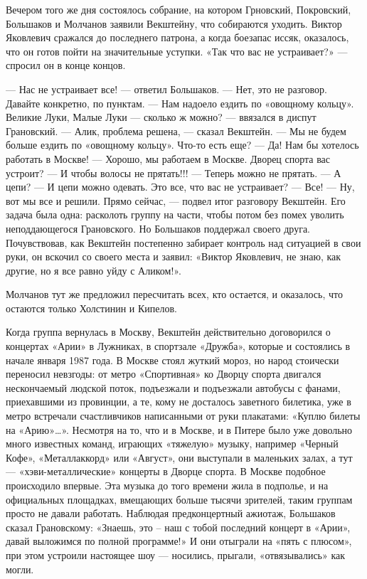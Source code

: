\documentclass[16pt,a5paper,oneside]{book}
\begin{document}
Вечером того же дня состоялось собрание, на котором Грновский, Покровский, Большаков и Молчанов заявили Векштейну, что
собираются уходить. Виктор Яковлевич сражался до последнего патрона, а когда боезапас иссяк, оказалось, что он готов
пойти на значительные уступки. «Так что вас не устраивает?» — спросил он в конце концов.

— Нас не устраивает все! — ответил Большаков.
— Нет, это не разговор. Давайте конкретно, по пунктам.
— Нам надоело ездить по «овощному кольцу». Великие Луки, Малые Луки — сколько ж можно? — ввязался в диспут Грановский.
— Алик, проблема решена, — сказал Векштейн. — Мы не будем больше ездить по «овощному кольцу». Что-то есть еще?
— Да! Нам бы хотелось работать в Москве!
— Хорошо, мы работаем в Москве. Дворец спорта вас устроит?
— И чтобы волосы не прятать!!!
— Теперь можно не прятать.
— А цепи?
— И цепи можно одевать. Это все, что вас не устраивает?
— Все!
— Ну, вот мы все и решили. Прямо сейчас, — подвел итог разговору Векштейн. Его задача была одна: расколоть группу на
части, чтобы потом без помех уволить неподдающегося Грановского. Но Большаков поддержал своего друга. Почувствовав, как
Векштейн постепенно забирает контроль над ситуацией в свои руки, он вскочил со своего места и заявил: «Виктор Яковлевич,
не знаю, как другие, но я все равно уйду с Аликом!».

Молчанов тут же предложил пересчитать всех, кто остается, и оказалось, что остаются только Холстинин и Кипелов.

Когда группа вернулась в Москву, Векштейн действительно договорился о концертах «Арии» в Лужниках, в спортзале «Дружба»,
которые и состоялись в начале января 1987 года. В Москве стоял жуткий мороз, но народ стоически переносил невзгоды: от
метро «Спортивная» ко Дворцу спорта двигался нескончаемый людской поток, подъезжали и подъезжали автобусы с фанами,
приехавшими из провинции, а те, кому не досталось заветного билетика, уже в метро встречали счастливчиков написанными от
руки плакатами: «Куплю билеты на «Арию»\ldots». Несмотря на то, что и в Москве, и в Питере было уже довольно много
известных команд, играющих «тяжелую» музыку, например «Черный Кофе», «Металлаккорд» или «Август», они выступали в
маленьких залах, а тут — «хэви-металлические» концерты в Дворце спорта. В Москве подобное происходило впервые. Эта
музыка до того времени жила в подполье, и на официальных площадках, вмещающих больше тысячи зрителей, таким группам
просто не давали работать. Наблюдая предконцертный ажиотаж, Большаков сказал Грановскому: «Знаешь, это – наш с тобой
последний концерт в «Арии», давай выложимся по полной программе!» И они отыграли на «пять с плюсом», при этом устроили
настоящее шоу — носились, прыгали, «отвязывались» как могли.
\end{document}

